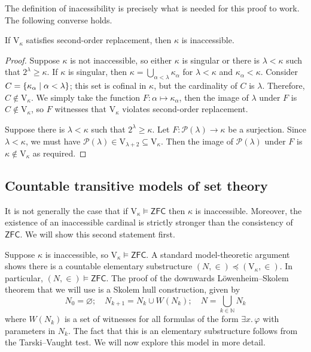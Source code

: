 The definition of inacessibility is precisely what is needed for this proof to work.
The following converse holds.
\begin{theorem}[Shepherdson]
    If \( \mathrm{V}_\kappa \) satisfies second-order replacement, then \( \kappa \) is inaccessible.
\end{theorem}
\begin{proof}
    Suppose \( \kappa \) is not inaccessible, so either \( \kappa \) is singular or there is \( \lambda < \kappa \) such that \( 2^\lambda \geq \kappa \).
    If \( \kappa \) is singular, then \( \kappa = \bigcup_{\alpha < \lambda} \kappa_\alpha \) for \( \lambda < \kappa \) and \( \kappa_\alpha < \kappa \).
    Consider \( C = \qty{\kappa_\alpha \mid \alpha < \lambda} \); this set is cofinal in \( \kappa \), but the cardinality of \( C \) is \( \lambda \).
    Therefore, \( C \notin \mathrm{V}_\kappa \).
    We simply take the function \( F : \alpha \mapsto \kappa_\alpha \), then the image of \( \lambda \) under \( F \) is \( C \notin \mathrm{V}_\kappa \), so \( F \) witnesses that \( \mathrm{V}_\kappa \) violates second-order replacement.

    Suppose there is \( \lambda < \kappa \) such that \( 2^\lambda \geq \kappa \).
    Let \( F : \mathcal P(\lambda) \to \kappa \) be a surjection.
    Since \( \lambda < \kappa \), we must have \( \mathcal P(\lambda) \in \mathrm{V}_{\lambda + 2} \subseteq \mathrm{V}_\kappa \).
    Then the image of \( \mathcal P(\lambda) \) under \( F \) is \( \kappa \notin \mathrm{V}_\kappa \) as required.
\end{proof}

\subsection{Countable transitive models of set theory}
It is not generally the case that if \( \mathrm{V}_\kappa \vDash \mathsf{ZFC} \) then \( \kappa \) is inaccessible.
Moreover, the existence of an inaccessible cardinal is strictly stronger than the consistency of \( \mathsf{ZFC} \).
We will show this second statement first.

Suppose \( \kappa \) is inaccessible, so \( \mathrm{V}_\kappa \vDash \mathsf{ZFC} \).
A standard model-theoretic argument shows there is a countable elementary substructure \( (N, \in) \preceq (\mathrm{V}_\kappa, \in) \).
In particular, \( (N, \in) \vDash \mathsf{ZFC} \).
The proof of the downwards L\"owenheim--Skolem theorem that we will use is a Skolem hull construction, given by
\[ N_0 = \varnothing;\quad N_{k+1} = N_k \cup W(N_k);\quad N = \bigcup_{k \in \mathbb N} N_k \]
where \( W(N_k) \) is a set of witnesses for all formulas of the form \( \exists x.\, \varphi \) with parameters in \( N_k \).
The fact that this is an elementary substructure follows from the Tarski--Vaught test.
We will now explore this model in more detail.

